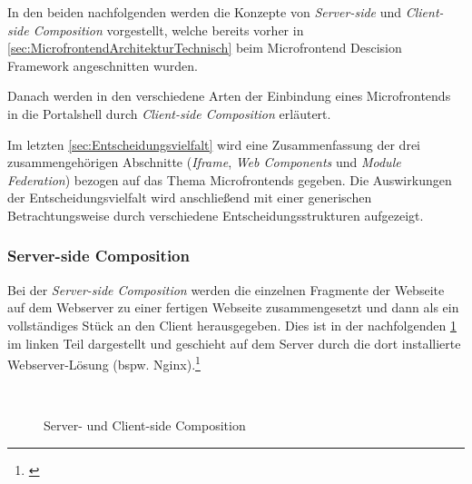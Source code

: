 In den beiden nachfolgenden  werden die Konzepte von \textit{Server-side} und \textit{Client-side Composition} vorgestellt, welche bereits vorher in \cref{sec:MicrofrontendArchitekturTechnisch} beim Microfrontend Descision Framework angeschnitten wurden.

Danach werden in den  verschiedene Arten der Einbindung eines Microfrontends in die Portalshell durch \textit{Client-side Composition} erläutert.

Im letzten \cref{sec:Entscheidungsvielfalt} wird eine Zusammenfassung der drei zusammengehörigen Abschnitte (\textit{Iframe}, \textit{Web Components} und \textit{Module Federation}) bezogen auf das Thema Microfrontends gegeben. Die Auswirkungen der Entscheidungsvielfalt wird anschließend mit einer generischen Betrachtungsweise durch verschiedene Entscheidungsstrukturen aufgezeigt.

\subsubsection{Server-side Composition}\label{sec:ServerSideComposition}

Bei der \textit{Server-side Composition} werden die einzelnen Fragmente der Webseite auf dem Webserver zu einer fertigen Webseite zusammengesetzt und dann als ein vollständiges Stück an den Client herausgegeben. Dies ist in der nachfolgenden \cref{fig:ServerClientSideComposition} im linken Teil dargestellt und geschieht auf dem Server durch die dort installierte Webserver-Lösung (bspw. Nginx).\footnote{\cite[vgl.][60]{Geers2020}}

\begin{figure}[hbt!]
	\centering
	\begin{minipage}[t]{1\textwidth}	
		\caption{Server- und Client-side Composition}
		\\ %
		\label{fig:ServerClientSideComposition}
	\end{minipage}
\end{figure}

